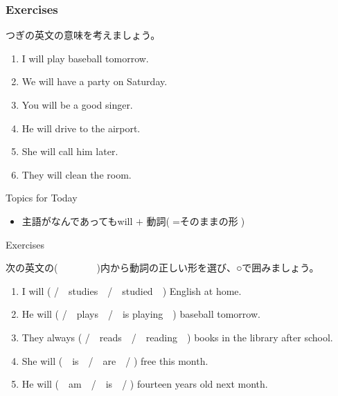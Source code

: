 \documentclass[aspectratio=169,xcolor={dvipsnames,table}]{beamer}
\begin{document}
\begin{frame}[plain]\frametitle{Exercises}

つぎの英文の意味を考えましょう。

\begin{enumerate}
 \item I will play baseball tomorrow.
 \item We will have a party on Saturday.
 \item You will be a good singer.
 \item He will drive to the airport.
 \item She will call him later.
 \item They will clean the room.
\end{enumerate}

\pause

\vfill

\begin{exampleblock}{Topics for Today}
\pause
\begin{itemize}\small
 \item   主語がなんであってもwill $+$ 動詞($=\text{そのままの形}$)
 \end{itemize}
     \end{exampleblock}
\end{frame}


\begin{frame}[plain]{Exercises}

次の英文の(~~~~~~~~)内から動詞の正しい形を選び、○で囲みましょう。 

\begin{enumerate}
 \item I will (   /~~studies~~/~~studied~~) English at home.
 \item He will (  /~~plays~~/~~is playing~~) baseball tomorrow.
 \item They always (   /~~reads~~/~~reading~~) books in the library after school.
 \item She will (~~is~~/~~are~~/  ) free this month.
 \item He will (~~am~~/~~is~~/  ) fourteen years old next month.
\end{enumerate}

\end{frame}
\end{document}
